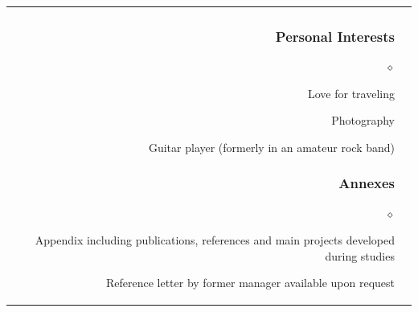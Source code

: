 \documentclass[a4paper]{article}
\renewenvironment{itemize}{
  \begin{list}{$\diamond$}{
    \setlength{\topsep}{0.25em}
    \setlength{\itemsep}{0em}
    \setlength{\parskip}{0pt}
    \setlength{\parsep}{0em}
  }
}{
  \end{list}
}
\begin{document}
\begin{longtable}{r || l}
\begin{minipage}{0.9\textwidth}
      \subsubsection*{Personal Interests}
      \begin{itemize}
          \item Love for traveling
          \item Photography
          \item Guitar player (formerly in an amateur rock band)
      \end{itemize}

      \subsubsection*{Annexes}
      \begin{itemize}
          \item Appendix including publications, references and main projects developed during studies
          \item Reference letter by former manager available upon request
      \end{itemize}
      \vfill
    \end{minipage} \\

  \end{longtable}
\end{document}
